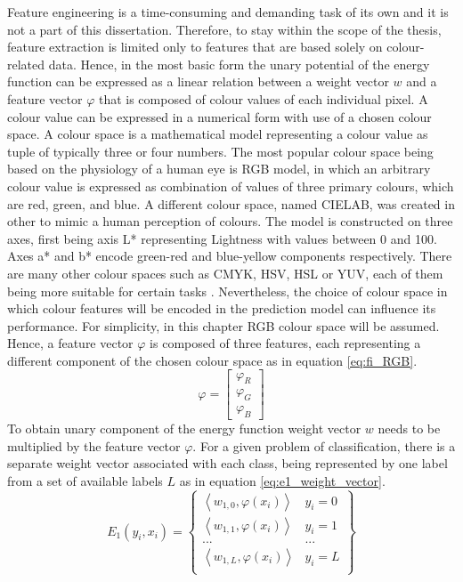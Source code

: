 Feature engineering is a time-consuming and demanding task of its own and it is not a part of this dissertation. Therefore, to stay within the scope of the thesis, feature extraction is limited only to features that are based solely on colour-related data. Hence, in the most basic form the unary potential of the energy function can be expressed as a linear relation between a weight vector $w$ and a feature vector $\varphi$ that is composed of colour values of each individual pixel.
A colour value can be expressed in a numerical form with use of a chosen colour space. A colour space is a mathematical model representing a colour value as tuple of typically three or four numbers. The most popular colour space being based on the physiology of a human eye is RGB model, in which an arbitrary colour value is expressed as combination of values of three primary colours, which are red, green, and blue. A different colour space, named CIELAB, was created in other to mimic a human perception of colours. The model is constructed on three axes, first being axis L* representing Lightness with values between 0 and 100. Axes a* and b* encode green-red and blue-yellow components respectively. There are many other colour spaces such as CMYK, HSV, HSL or YUV, each of them being more suitable for certain tasks \cite{colour_space}. Nevertheless, the choice of colour space in which colour features will be encoded in the prediction model can influence its performance. For simplicity, in this chapter RGB colour space will be assumed. Hence, a feature vector $\varphi$ is composed of three features, each representing a different component of the chosen colour space as in equation \ref{eq:fi_RGB}.
\begin{equation}
    \label{eq:fi_RGB}
    \varphi = \begin{bmatrix}
        \varphi_R\\ 
        \varphi_G\\ 
        \varphi_B
    \end{bmatrix}
\end{equation}
To obtain unary component of the energy function weight vector $w$ needs to be multiplied by the feature vector $\varphi$. For a given problem of classification, there is a separate weight vector associated with each class, being represented by one label from a set of available labels $L$ as in equation \ref{eq:e1_weight_vector}. 
\begin{equation}
    \label{eq:e1_weight_vector}
    E_1(y_i,x_i)= 
    \begin{Bmatrix}
        \left \langle w_{1,0}, \varphi({x_i}) \right \rangle & y_i = 0\\ 
        \left \langle w_{1,1}, \varphi({x_i}) \right \rangle & y_i = 1\\
         ...& ...\\ 
        \left \langle w_{1,L}, \varphi({x_i}) \right \rangle & y_i = L\\  
    \end{Bmatrix}
\end{equation}
